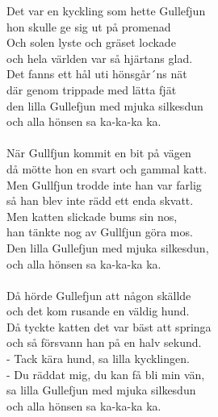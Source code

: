 \vspace{10pt}
Det var en kyckling som hette Gullefjun \\
hon skulle ge sig ut på promenad\\
Och solen lyste och gräset lockade\\
och hela världen var så hjärtans glad. \\
Det fanns ett hål uti hönsgår´ns nät\\
där genom trippade med lätta fjät \\
den lilla Gullefjun med mjuka silkesdun\\
och alla hönsen sa ka-ka-ka ka.\\
\\
När Gullfjun kommit en bit på vägen\\
då mötte hon en svart och gammal katt.\\
Men Gullfjun trodde inte han var farlig\\
så han blev inte rädd ett enda skvatt.\\
Men katten slickade bums sin nos,\\
han tänkte nog av Gullfjun göra mos.\\
Den lilla Gullefjun med mjuka silkesdun,\\
och alla hönsen sa ka-ka-ka ka.\\
\\
Då hörde Gullefjun att någon skällde\\
och det kom rusande en väldig hund.\\
Då tyckte katten det var bäst att springa\\
och så försvann han på en halv sekund.\\
- Tack kära hund, sa lilla kycklingen.\\
- Du räddat mig, du kan få bli min vän,\\
sa lilla Gullefjun med mjuka silkesdun\\
och alla hönsen sa ka-ka-ka ka.

